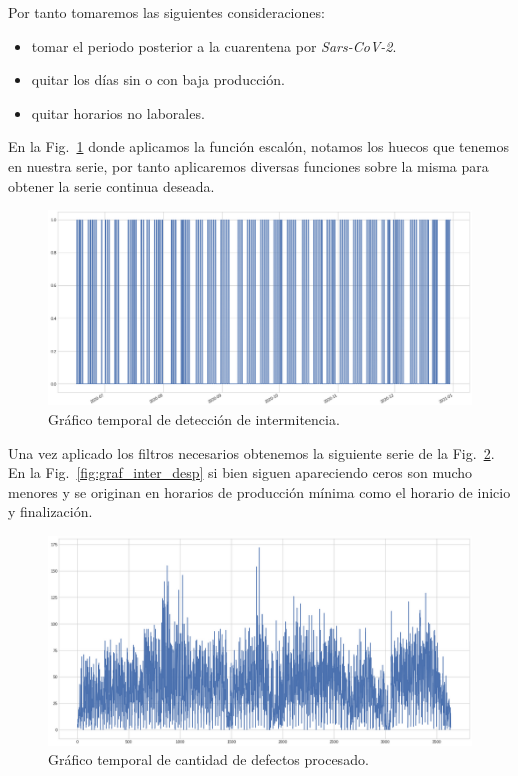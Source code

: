 \documentclass[a4paper,12pt]{article}
\begin{document}
Por tanto tomaremos las siguientes consideraciones:

\begin{itemize}
	\item tomar el periodo posterior a la cuarentena por \textit{Sars-CoV-2}.
	\item quitar los días sin o con baja producción.
	\item quitar horarios no laborales.
\end{itemize}

En la Fig.~\ref{fig:graf_inter_antes} donde aplicamos la función escalón, notamos los huecos que tenemos en nuestra serie, por tanto aplicaremos diversas funciones sobre la misma para obtener la serie continua deseada.

\begin{figure}[H]
	\begin{center}
	\includegraphics[width=1\textwidth]{tesis_79.png}
  	\caption{Gráfico temporal de detección de intermitencia.}
  	\label{fig:graf_inter_antes}
  	\end{center}
\end{figure}

Una vez aplicado los filtros necesarios obtenemos la siguiente serie de la Fig.~\ref{fig:graf_cantdef_desp}. En la Fig.~\ref{fig:graf_inter_desp} si bien siguen apareciendo ceros son mucho menores y se originan en horarios de producción mínima como el horario de inicio y finalización.

\begin{figure}[H]
	\begin{center}
	\includegraphics[width=1\textwidth]{tesis_80.png}
  	\caption{Gráfico temporal de cantidad de defectos procesado.}
  	\label{fig:graf_cantdef_desp}
  	\end{center}
\end{figure}
\end{document}
